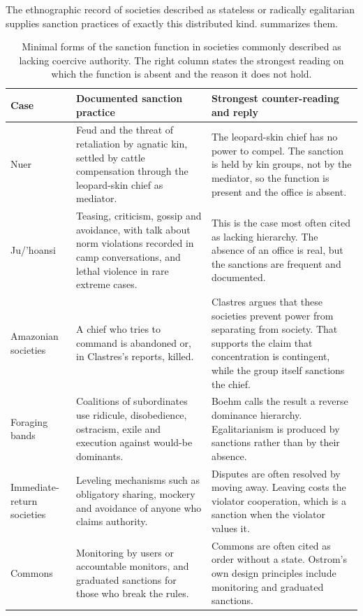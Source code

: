 \documentclass[11pt,letterpaper]{article}
\theoremstyle{definition}
\theoremstyle{remark}
\begin{document}
The ethnographic record of societies described as stateless or radically egalitarian supplies sanction practices of exactly this distributed kind.  summarizes them.

\begin{table}[!htbp]
\centering
\small
\caption{Minimal forms of the sanction function in societies commonly described as lacking coercive authority. The right column states the strongest reading on which the function is absent and the reason it does not hold.}
\label{tab:hardcases}
\renewcommand{\arraystretch}{1.15}
\begin{tabularx}{\textwidth}{@{}L{2.3cm}YY@{}}
\toprule
Case & Documented sanction practice & Strongest counter-reading and reply \\
\midrule
Nuer \citep{evanspritchard1940} & Feud and the threat of retaliation by agnatic kin, settled by cattle compensation through the leopard-skin chief as mediator. & The leopard-skin chief has no power to compel. The sanction is held by kin groups, not by the mediator, so the function is present and the office is absent. \\
Ju/'hoansi \citep{lee2013,marshall1976,wiessner2005} & Teasing, criticism, gossip and avoidance, with talk about norm violations recorded in camp conversations, and lethal violence in rare extreme cases. & This is the case most often cited as lacking hierarchy. The absence of an office is real, but the sanctions are frequent and documented. \\
Amazonian societies \citep{clastres1987} & A chief who tries to command is abandoned or, in Clastres's reports, killed. & Clastres argues that these societies prevent power from separating from society. That supports the claim that concentration is contingent, while the group itself sanctions the chief. \\
Foraging bands \citep{boehm1999,boehm2012} & Coalitions of subordinates use ridicule, disobedience, ostracism, exile and execution against would-be dominants. & Boehm calls the result a reverse dominance hierarchy. Egalitarianism is produced by sanctions rather than by their absence. \\
Immediate-return societies \citep{woodburn1982} & Leveling mechanisms such as obligatory sharing, mockery and avoidance of anyone who claims authority. & Disputes are often resolved by moving away. Leaving costs the violator cooperation, which is a sanction when the violator values it. \\
Commons \citep{ostrom1990,ostromdesign2010,cox2010} & Monitoring by users or accountable monitors, and graduated sanctions for those who break the rules. & Commons are often cited as order without a state. Ostrom's own design principles include monitoring and graduated sanctions. \\
\bottomrule
\end{tabularx}
\end{table}
\end{document}
